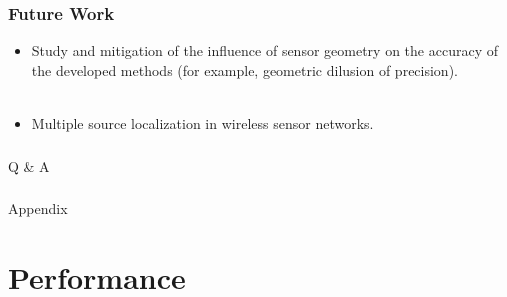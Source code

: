 \documentclass [t] {beamer} %
\begin{document}
\begin{frame} %
\frametitle{Future Work}
\phantom{m}
\phantom{m}
\phantom{m}
\begin{itemize}
\item
Study and mitigation of the influence of sensor geometry on the accuracy of the developed methods (for example, geometric dilusion of precision).
\\~\\
\item
Multiple source localization in wireless sensor networks.
\end{itemize}
\end{frame}


\begin{frame} [noframenumbering]
\frametitle{  }
\phantom{m} 
\phantom{m}
\phantom{m} 
\phantom{m}
\phantom{m} 
\phantom{m}
\Huge{\centerline{Q \& A }}

\end{frame}

%
\appendix
\begin{frame} [noframenumbering]
\frametitle{  }
\phantom{m} 
\phantom{m}
\phantom{m} 
\phantom{m}
\phantom{m} 
\phantom{m}
\Huge{\centerline{Appendix}}
\end{frame}

\section{Performance}
\end{document}
